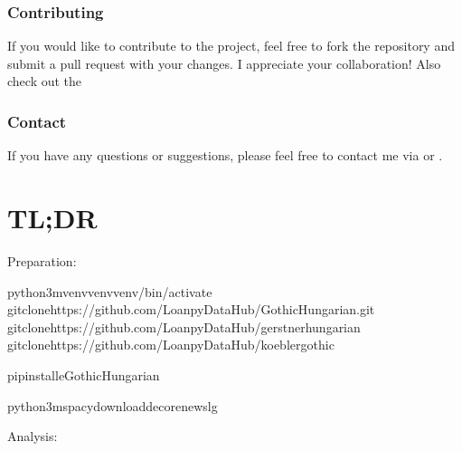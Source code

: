 \documentclass[letterpaper,10pt,english]{sphinxmanual}
\begin{document}
\subsection{Contributing}
\label{\detokenize{home:contributing}}
\sphinxAtStartPar
If you would like to contribute to the project, feel free to fork the
repository and submit a pull request with your changes. I appreciate
your collaboration! Also check out the 


\subsection{Contact}
\label{\detokenize{home:contact}}
\sphinxAtStartPar
If you have any questions or suggestions, please feel free to contact me
via  or
.

\sphinxstepscope


\chapter{TL;DR}
\label{\detokenize{TL;DR:id1}}\label{\detokenize{TL;DR::doc}}\label{\detokenize{TL;DR:module-gothuncommands.__init__}}
\sphinxAtStartPar
Preparation:

\begin{sphinxVerbatim}[commandchars=\\\{\}]
python3\PYGZhy{}mvenvvenvvenv/bin/activate
gitclonehttps://github.com/LoanpyDataHub/GothicHungarian.git
gitclonehttps://github.com/LoanpyDataHub/gerstnerhungarian
gitclonehttps://github.com/LoanpyDataHub/koeblergothic

pipinstall\PYGZhy{}eGothicHungarian

python3\PYGZhy{}mspacydownloadde\PYGZus{}core\PYGZus{}news\PYGZus{}lg
\end{sphinxVerbatim}

\sphinxAtStartPar
Analysis:
\end{document}
